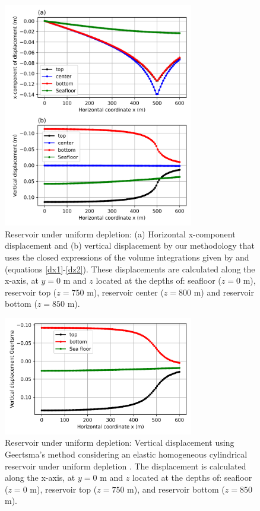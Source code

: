 \documentclass[journal abbreviation, manuscript]{copernicus}
\begin{document}
\begin{figure}[h]
\includegraphics[width=8.3cm]{Fig/Figure_Displacement_z_levels.png}
\caption{Reservoir under uniform depletion: (a) Horizontal x-component displacement and (b) vertical displacement by our methodology that uses the closed expressions of the volume integrations given by \cite{Nagyetal2000} and \cite{Nagyetal2002} (equations \ref{dx1}-\ref{dz2}).
These displacements are calculated along the x-axis, at $y = 0$ m and $z$ located at the depths of:  seafloor ($z = 0$ m), reservoir top ($z = 750$ m), reservoir center ($z = 800$ m) and reservoir bottom ($z = 850$ m).}
\label{fig:displacement_z_levels}
\end{figure}

\begin{figure}[h]
\includegraphics[width=8.3cm]{Fig/Figure_Displacement_z_levels_Geertsma.png}
\caption{Reservoir under uniform depletion: Vertical displacement using Geertsma’s method \citep{Geertsma73}  considering an elastic homogeneous cylindrical reservoir under uniform depletion \citep{Fjaer08}.
The displacement is calculated along the x-axis, at $y = 0$ m and $z$ located at the depths of:  seafloor ($z = 0$ m), reservoir top ($z = 750$ m), and reservoir bottom 
($z = 850$ m).}
\label{fig:displacement_z_levels_Geertsma}
\end{figure}
\end{document}
